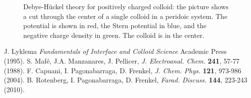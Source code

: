 \documentclass[aps,pre,preprint,groupedaddress]{revtex4-1}
\begin{document}
\begin{figure}[h!t]
\caption{Debye-H\"uckel theory for positively charged colloid: the picture
shows a cut through the center of a single colloid in a peridoic system.
The potential is shown in red, the Stern potential in blue, and the negative 
charge density in green. The colloid is in the center.}
\label{fig7}
\end{figure}

\clearpage
\begin{thebibliography}{99}

 J. Lyklema {\em Fundamentals of Interface and Colloid Science} Academic Press (1995).
 S. Maf\'e, J.A. Manzanares, J. Pellicer, {\em J. Electroanal. Chem.} {\bf 241}, 57-77 (1988).
 F. Capuani, I. Pagonabarraga, D. Frenkel, {\em J. Chem. Phys.} {\bf 121}, 973-986 (2004).
 B. Rotenberg, I. Pagonabarraga, D. Frenkel, {\em Farad. Discuss.} {\bf 144}, 223-243 (2010).

\end{thebibliography}
\end{document}

